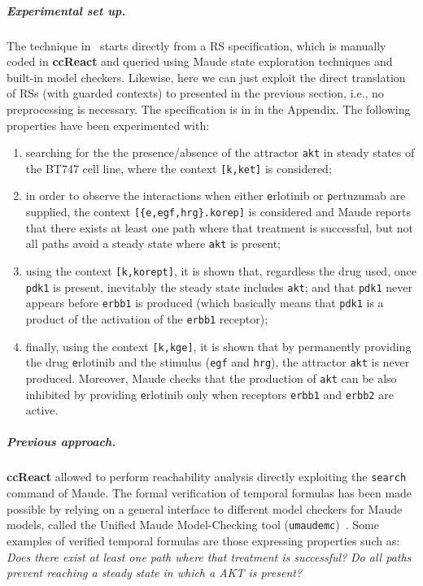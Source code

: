 \subparagraph*{Experimental set up.}
The technique in~\cite{DBLP:conf/cmsb/BallisBFO24} starts directly from a RS specification, which is manually coded in \textbf{ccReact} and queried using Maude state exploration techniques and built-in model checkers. Likewise, here we can just exploit the direct translation of RSs (with guarded contexts) to \GROOVE presented in the previous section, i.e., no preprocessing is necessary. The \BioResolve specification is in  in the Appendix.
The following properties have been experimented with:
\begin{enumerate}
\item searching for the the presence/absence of the attractor \texttt{akt} in steady states of the BT747 cell line, where the context \verb=[k,ket]= is considered;

\item in order to observe the interactions when either \texttt{e}rlotinib or \texttt{p}ertuzumab are supplied, the context \verb=[{e,egf,hrg}.korep]= is considered and Maude reports that there exists at least one path where that treatment is successful, but not all paths avoid a steady state where \texttt{akt} is present;

\item using the context \verb=[k,korept]=, it is shown that, regardless the drug used, once \texttt{pdk1} is present, inevitably the steady state includes \texttt{akt}; and that \texttt{pdk1} never appears before \texttt{erbb1} is produced (which basically means that \texttt{pdk1} is a product of the activation of the \texttt{erbb1} receptor);

\item finally, using the context \verb=[k,kge]=, it is shown that by permanently providing the drug \texttt{e}rlotinib and the stimulus (\texttt{egf} and \texttt{hrg}), the attractor \texttt{akt} is never produced. Moreover, Maude checks that the production of \texttt{akt} can be also inhibited by providing \texttt{e}rlotinib only when receptors \texttt{erbb1} and \texttt{erbb2} are active.
\end{enumerate}

\subparagraph*{Previous approach.}
\textbf{ccReact} allowed to perform reachability analysis directly exploiting the \texttt{search} command of Maude. 
The formal verification of temporal formulas has been made possible by relying on a general interface to different model checkers for Maude models, called the Unified Maude Model-Checking tool (\texttt{umaudemc})~\cite{DBLP:journals/jlap/RubioMPV21}.
Some examples of verified temporal formulas are those expressing properties such as:
\emph{Does there exist at least one path where that treatment is successful?}
\emph{Do all paths prevent reaching a steady state in which a AKT is present?}

